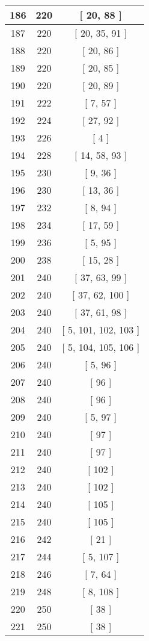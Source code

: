 \begin{center}
\begin{longtable}[H]{|| c c c ||}
\\\hline
186 & 220 & [ 20, 88 ]
\\\hline
187 & 220 & [ 20, 35, 91 ]
\\\hline
188 & 220 & [ 20, 86 ]
\\\hline
189 & 220 & [ 20, 85 ]
\\\hline
190 & 220 & [ 20, 89 ]
\\\hline
191 & 222 & [ 7, 57 ]
\\\hline
192 & 224 & [ 27, 92 ]
\\\hline
193 & 226 & [ 4 ]
\\\hline
194 & 228 & [ 14, 58, 93 ]
\\\hline
195 & 230 & [ 9, 36 ]
\\\hline
196 & 230 & [ 13, 36 ]
\\\hline
197 & 232 & [ 8, 94 ]
\\\hline
198 & 234 & [ 17, 59 ]
\\\hline
199 & 236 & [ 5, 95 ]
\\\hline
200 & 238 & [ 15, 28 ]
\\\hline
201 & 240 & [ 37, 63, 99 ]
\\\hline
202 & 240 & [ 37, 62, 100 ]
\\\hline
203 & 240 & [ 37, 61, 98 ]
\\\hline
204 & 240 & [ 5, 101, 102, 103 ]
\\\hline
205 & 240 & [ 5, 104, 105, 106 ]
\\\hline
206 & 240 & [ 5, 96 ]
\\\hline
207 & 240 & [ 96 ]
\\\hline
208 & 240 & [ 96 ]
\\\hline
209 & 240 & [ 5, 97 ]
\\\hline
210 & 240 & [ 97 ]
\\\hline
211 & 240 & [ 97 ]
\\\hline
212 & 240 & [ 102 ]
\\\hline
213 & 240 & [ 102 ]
\\\hline
214 & 240 & [ 105 ]
\\\hline
215 & 240 & [ 105 ]
\\\hline
216 & 242 & [ 21 ]
\\\hline
217 & 244 & [ 5, 107 ]
\\\hline
218 & 246 & [ 7, 64 ]
\\\hline
219 & 248 & [ 8, 108 ]
\\\hline
220 & 250 & [ 38 ]
\\\hline
221 & 250 & [ 38 ]
\\\hline

\end{longtable}
\end{center}

